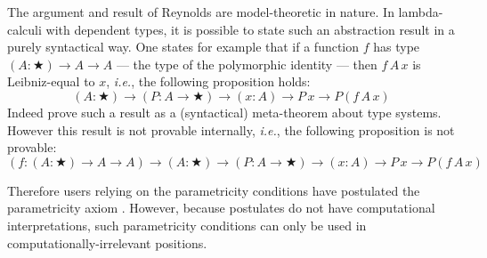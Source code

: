 \documentclass[english]{PaperTools/latex/entcs}
\theoremstyle{plain}
\theoremstyle{definition}
\theoremstyle{remark}
\def\ie{\textit{i.e.}}
\begin{document}
The argument and result of Reynolds are model-theoretic in nature.
In lambda-calculi with dependent types, it is possible to state such an
abstraction result in a purely syntactical way.
One states for example that if a function $f$ has type
$(A : ★) → A → A$ --- the type of the polymorphic identity --- then
$f\,A\,x$ is Leibniz-equal to $x$, \ie, the following proposition holds:
$$ (A : ★) → (P : A → ★) → (x : A) → P\, x → P (f\, A\, x) $$
%
Indeed \citet{bernardy_proofs_2012} prove such a result as a
(syntactical) meta-theorem about type systems. However this result is
not provable internally, \ie, the following proposition is not provable:
\begin{equation}
  \label{eq:param-id}
  (f : (A:★) → A → A) →  (A : ★) → (P : A → ★) → (x : A) → P\, x → P (f\, A\, x)
\end{equation}

Therefore users relying on the parametricity conditions have
postulated the parametricity axiom
\citep{pouillard_nameless_2011,chlipala_parametric_2008,atkey_unembedding_2009}.
However, %
because postulates do not have computational interpretations, such
parametricity conditions can only be used in computationally-irrelevant
positions.
\end{document}
